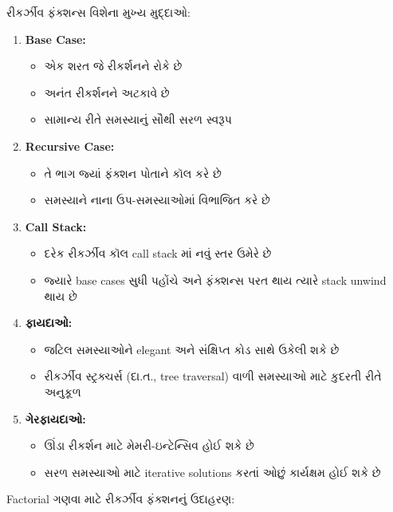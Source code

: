 રીકર્ઝીવ ફંક્શન્સ વિશેના મુખ્ય મુદ્દાઓ:

\begin{enumerate}
\def\labelenumi{\arabic{enumi}.}
\tightlist
\item
  \textbf{Base Case:}

  \begin{itemize}
  \tightlist
  \item
    એક શરત જે રીકર્શનને રોકે છે
  \item
    અનંત રીકર્શનને અટકાવે છે
  \item
    સામાન્ય રીતે સમસ્યાનું સૌથી સરળ સ્વરૂપ
  \end{itemize}
\item
  \textbf{Recursive Case:}

  \begin{itemize}
  \tightlist
  \item
    તે ભાગ જ્યાં ફંક્શન પોતાને કૉલ કરે છે
  \item
    સમસ્યાને નાના ઉપ-સમસ્યાઓમાં વિભાજિત કરે છે
  \end{itemize}
\item
  \textbf{Call Stack:}

  \begin{itemize}
  \tightlist
  \item
    દરેક રીકર્ઝીવ કૉલ call stack માં નવું સ્તર ઉમેરે છે
  \item
    જ્યારે base cases સુધી પહોંચે અને ફંક્શન્સ પરત થાય ત્યારે stack unwind થાય છે
  \end{itemize}
\item
  \textbf{ફાયદાઓ:}

  \begin{itemize}
  \tightlist
  \item
    જટિલ સમસ્યાઓને elegant અને સંક્ષિપ્ત કોડ સાથે ઉકેલી શકે છે
  \item
    રીકર્ઝીવ સ્ટ્રક્ચર્સ (દા.ત., tree traversal) વાળી સમસ્યાઓ માટે કુદરતી રીતે
    અનુકૂળ
  \end{itemize}
\item
  \textbf{ગેરફાયદાઓ:}

  \begin{itemize}
  \tightlist
  \item
    ઊંડા રીકર્શન માટે મેમરી-ઇન્ટેન્સિવ હોઈ શકે છે
  \item
    સરળ સમસ્યાઓ માટે iterative solutions કરતાં ઓછું કાર્યક્ષમ હોઈ શકે છે
  \end{itemize}
\end{enumerate}

Factorial ગણવા માટે રીકર્ઝીવ ફંક્શનનું ઉદાહરણ:

